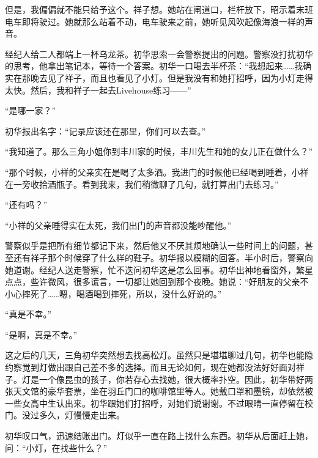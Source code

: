 \documentclass{article}
\begin{document}
但是，我偏偏就不能只给予这个。祥子想。她站在闸道口，栏杆放下，昭示着末班电车即将驶过。她就那么站着不动，电车驶来之前，她听见风吹起像海浪一样的声音。



经纪人给二人都端上一杯乌龙茶。初华思索一会警察提出的问题。警察没打扰初华的思考，他拿出笔记本，等待一个答案。初华一口喝去半杯茶：“我想起来……我确实在那晚去见了祥子，而且也看见了小灯。但是我没有和她打招呼，因为小灯走得太快。然后，我和祥子一起去Livehouse练习——”



“是哪一家？”



初华报出名字：“记录应该还在那里，你们可以去查。”



“我知道了。那么三角小姐你到丰川家的时候，丰川先生和她的女儿正在做什么？”



“那个时候，小祥的父亲实在是喝了太多酒。我进门的时候他已经喝到睡着，小祥在一旁收拾酒瓶子。看到我来，我们稍微聊了几句，就打算出门去练习。”



“还有吗？”



“小祥的父亲睡得实在太死，我们出门的声音都没能吵醒他。”



警察似乎是把所有细节都记下来，然后他又不厌其烦地确认一些时间上的问题，甚至还有祥子那个时候穿了什么样的鞋子。初华报以模糊的回答。半小时后，警察向她道谢。经纪人送走警察，忙不迭问初华这是怎么回事。初华出神地看窗外，繁星点点，些许微风，很多谎言，一切都让她回到那个夜晚。她说：“好朋友的父亲不小心摔死了……嗯，喝酒喝到摔死，所以，没什么好说的。”



“真是不幸。”



“是啊，真是不幸。”



这之后的几天，三角初华突然想去找高松灯。虽然只是堪堪聊过几句，初华也能隐约察觉到灯做出跟自己差不多的选择。而且无论如何，现在她都没法好好面对祥子。灯是一个像昆虫的孩子，你若存心去找她，很大概率扑空。因此，初华带好两张天文馆的豪华套票，坐在羽丘门口的咖啡馆里等人。她戴口罩和墨镜，却依然被一些女高中生认出来。初华跟她们打招呼，对她们说谢谢。不过眼睛一直停留在校门。没过多久，灯慢慢走出来。



初华叹口气，迅速结账出门。灯似乎一直在路上找什么东西。初华从后面赶上她，问：“小灯，在找些什么？”
\end{document}
